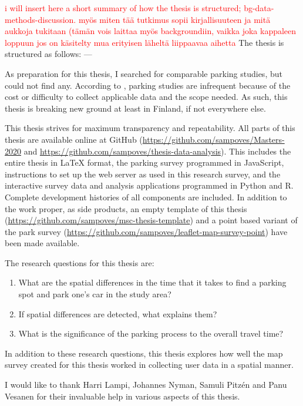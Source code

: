 \textcolor{red}{i will insert here a short summary of how the thesis is structured; bg-data-methods-discussion. myös miten tää tutkimus sopii kirjallisuuteen ja mitä aukkoja tukitaan (tämän vois laittaa myös backgroundiin, vaikka joka kappaleen loppuun jos on käsitelty mua erityisen läheltä liippaavaa aihetta}
The thesis is structured as follows: ---

As preparation for this thesis, I searched for comparable parking studies, but could not find any. According to , parking studies are infrequent because of the cost or difficulty to collect applicable data and the scope needed. As such, this thesis is breaking new ground at least in Finland, if not everywhere else.

This thesis strives for maximum transparency and repeatability. All parts of this thesis are available online at GitHub (\textcolor{blue}{\url{https://github.com/sampoves/Masters-2020}} and \textcolor{blue}{\url{https://github.com/sampoves/thesis-data-analysis}}). This includes the entire thesis in LaTeX format, the parking survey programmed in JavaScript, instructions to set up the web server as used in this research survey, and the interactive survey data and analysis applications programmed in Python and R. Complete development histories of all components are included. In addition to the work proper, as side products, an empty template of this thesis (\textcolor{blue}{\url{https://github.com/sampoves/msc-thesis-template}}) and a point based variant of the park survey (\textcolor{blue}{\url{https://github.com/sampoves/leaflet-map-survey-point}}) have been made available.

\bigskip
\noindent
The research questions for this thesis are:

\begin{spacing}{1}
    \begin{enumerate}[label=\Roman*]
      \item What are the spatial differences in the time that it takes to find a parking spot and park one’s car in the study area?
      \item If spatial differences are detected, what explains them?
      \item What is the significance of the parking process to the overall travel time?
    \end{enumerate}
\end{spacing}
\bigskip
In addition to these research questions, this thesis explores how well the map survey created for this thesis worked in collecting user data in a spatial manner.

I would like to thank Harri Lampi, Johannes Nyman, Samuli Pitzén and Panu Vesanen for their invaluable help in various aspects of this thesis.